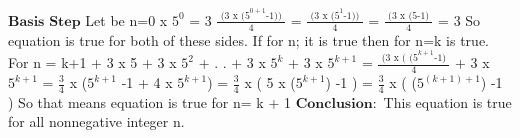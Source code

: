 \documentclass[a4 paper]{article}
\numberwithin{equation}{section}
\newcommand{\0}{\mathbf{0}}
\begin{document}
$\mathbf{Basis}$ $\mathbf{Step}$ 
\newline
Let be n=0
 x $5^{0}$ = 3
\newline
\newline
$\frac{\text{ (3 x ($5^{0+1}$-1)) }} {\text{ 4 }}$ = $\frac{\text{ (3 x ($5^{1}$-1)) }} {\text{ 4 }}$
 = $\frac{\text{ (3 x (5-1) }} {\text{ 4 }}$ = 3
\newline
\newline
So equation is true for both of these sides.
\newline
If for n; it is true then for n=k is true.
\newline
For n = k+1 
 + 3 x 5 + 3 x $5^2$ + . . + 3 x $5^k$ + 3 x $5^{k+1}$ =
\newline
\newline
$\frac{\text{ (3 x ( ($5^{k+1}$-1) }} {\text{ 4 }}$ + 3 x $5^{k+1}$
\newline
\newline
= $\frac{\text{3}} {\text{4}}$ x ($5^{k+1}$ -1  + 4 x $5^{k+1}$)
\newline
\newline
= $\frac{\text{3} } {\text{4} }$ x ( 5 x ($5^{k+1}$) -1 )
\newline
\newline
= $\frac{\text{3} } {\text{4} }$ x ( ($5^{(k+1) + 1}$) -1 )
\newline
\newline
So that means equation is true for n= k + 1
\newline
$\mathbf{Conclusion:}$  This equation is true for all nonnegative integer n.
\newline
\newline
\newline
\newline
\newline
\newline
\newline
\end{document}
